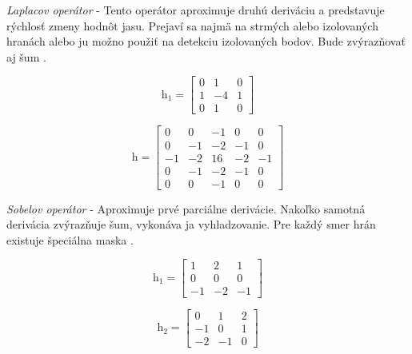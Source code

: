 \textit{Laplacov operátor} - Tento operátor aproximuje druhú deriváciu a predstavuje rýchlosť zmeny hodnôt jasu. Prejaví sa najmä na strmých alebo izolovaných hranách alebo ju možno použiť na detekciu izolovaných bodov. Bude zvýrazňovať aj šum \cite{Detekcia_a_rozpoznavanie_objektov}.

\vspace{5mm}

\begin{figure}[H]
    \centering
    \begin{minipage}[b]{0.49\textwidth}
        $$\textit{h}_1=\begin{bmatrix} 0 & 1 & 0 \\ 1 & -4 & 1 \\ 0 & 1 & 0  \end{bmatrix}$$
    \end{minipage}
    \hfill
    \begin{minipage}[b]{0.49\textwidth}
        $$\textit{h}=\begin{bmatrix} 0 & 0 & -1 & 0 & 0 \\ 0 & -1 & -2 & -1 & 0 \\ -1 & -2 & 16 & -2 & -1 \\ 0 & -1 & -2 & -1 & 0 \\ 0 & 0 & -1 & 0 & 0  \end{bmatrix}$$
    \end{minipage}
\end{figure}

\vspace{10mm}
\textit{Sobelov operátor} - Aproximuje prvé parciálne derivácie. Nakoľko samotná derivácia zvýrazňuje šum, vykonáva ja vyhladzovanie. Pre každý smer hrán existuje špeciálna maska \cite{Detekcia_a_rozpoznavanie_objektov}.

\begin{figure}[H]
    \centering
    \begin{minipage}[b]{0.49\textwidth}
        $$\textit{h}_1=\begin{bmatrix} 1 & 2 & 1 \\ 0 & 0 & 0 \\ -1 & -2 & -1  \end{bmatrix}$$
    \end{minipage}
    \hfill
    \begin{minipage}[b]{0.49\textwidth}
        $$\textit{h}_2=\begin{bmatrix} 0 & 1 & 2 \\ -1 & 0 & 1 \\ -2 & -1 & 0  \end{bmatrix}$$
    \end{minipage}
\end{figure}


